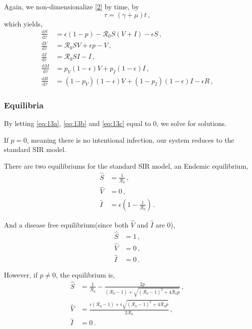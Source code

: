 \documentclass[12pt]{article}
\newcommand\dbyd[2]{\frac{\mathrm d{#1}}{\mathrm d{#2}}}
\newcommand{\R}{\mathcal{R}}
\newcommand{\pmV}{p_{V}}
\newcommand{\pmI}{p_{I}}
\begin{document}
Again, we non-dimensionalize \autoref{2} by time, by
\begin{equation}
\tau=(\gamma+\mu)t \,,
\end{equation}
which yields,
\begin{subequations}\label{eq:base_ODE}
\begin{align}
\dbyd{S}{\tau}&=\epsilon(1-p)- \R_0 S(V+I)-\epsilon S\,, \label{eq:13a}\\
\dbyd{V}{\tau}&=\R_0 SV+\epsilon p-V\,, \label{eq:13b}\\
\dbyd{I}{\tau}&=\R_0 SI-I\,, \label{eq:13c}\\
\dbyd{M}{\tau}&=\pmV(1-\epsilon) V+\pmI(1-\epsilon) I\,,\\
\dbyd{R}{\tau}&=(1-\pmV)(1-\epsilon) V+(1-\pmI)(1-\epsilon) I-\epsilon R\,,
\end{align}
\end{subequations}

\subsubsection{Equilibria}

By letting \autoref{eq:13a}, \autoref{eq:13b} and \autoref{eq:13c} equal to 0, we solve for solutions.

If $p=0$, meaning there is no intentional infection, our system reduces to the standard SIR model.

There are two equilibriums for the standard SIR model, an Endemic equilibrium,
\begin{subequations}
\begin{align}
\hat{S} &= \frac{1}{\R_0}\,,\\
\hat{V} &= 0\,,\\
\hat{I} &= \epsilon(1-\frac{1}{\R_0})\,.
\end{align}
\end{subequations}

And a disease free equilibrium(since both $\hat{V}$ and $\hat{I}$ are 0),
\begin{subequations}
\begin{align}
\hat{S} &= 1\,,\\
\hat{V} &= 0\,,\\
\hat{I} &= 0\,.
\end{align}
\end{subequations}

However, if $p\neq 0$, the equilibrium is,
\begin{subequations}
\begin{align}
\hat{S}&= \frac{1}{\R_0}-\frac{2p}{(\R_0 -1)+ \sqrt{(\R_0-1)^2+4\R_0
         p}}\,, \label{eq:3Shat}\\
\hat{V}&= \frac{\epsilon(\R_0 -1)+ \epsilon \sqrt{(\R_0-1)^2+4\R_0 p}}{2\R_0}\,, \label{eq:Vhat}\\
\hat{I}&=0\,. \label{eq:Ihat}
\end{align}
\end{subequations}
\end{document}
